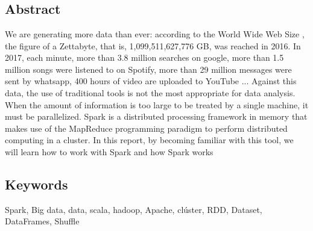 \chapter*{}

\section*{Abstract}

We are generating more data than ever: according to the World Wide Web Size , the figure of a Zettabyte, that is, 1,099,511,627,776 GB, was reached in 2016. In 2017, each minute, more than 3.8 million searches on google, more than 1.5 million songs were listened to on Spotify, more than 29 million messages were sent by whatsapp, 400 hours of video are uploaded to YouTube ... Against this data, the use of traditional tools is not the most appropriate for data analysis.\\

When the amount of information is too large to be treated by a single machine, it must be parallelized. Spark is a distributed processing framework in memory that makes use of the MapReduce programming paradigm to perform distributed computing in a cluster. In this report, by becoming familiar with this tool, we will learn how to work with Spark and how Spark works

{\setlength{\parskip}{30mm}
\section*{Keywords}
}
Spark, Big data, data, scala, hadoop, Apache, clúster, RDD, Dataset, DataFrames, Shuffle